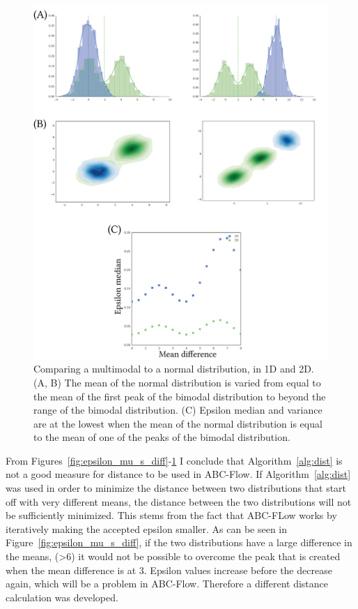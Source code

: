 \begin{figure}[tb]
\centering
\includegraphics[scale=0.7]{../../chapters/chapterABCFlow/images/multimodal_v_normal.png}
\caption[LoF caption]{Comparing a multimodal to a normal distribution, in 1D and 2D. (A, B) The mean of the normal distribution is varied from equal to the mean of the first peak of the bimodal distribution to beyond the range of the bimodal distribution. (C) Epsilon median and variance are at the lowest when the mean of the normal distribution is equal to the mean of one of the peaks of the bimodal distribution. }
\label{fig:multimodal_v_normal}
\end{figure}



From Figures~\ref{fig:epsilon_mu_s_diff}-\ref{fig:multimodal_v_normal} I conclude that Algorithm~\ref{alg:dist} is not a good measure for distance to be used in ABC-Flow. If Algorithm~\ref{alg:dist} was used in order to minimize the distance between two distributions that start off with very different means, the distance between the two distributions will not be sufficiently minimized. This stems from the fact that ABC-FLow works by iteratively making the accepted epsilon smaller. As can be seen in Figure~\ref{fig:epsilon_mu_s_diff}, if the two distributions have a large difference in the means, (>6) it would not be possible to overcome the peak that is created when the mean difference is at 3. Epsilon values increase before the decrease again, which will be a problem in ABC-Flow. Therefore a different distance calculation was developed. 
